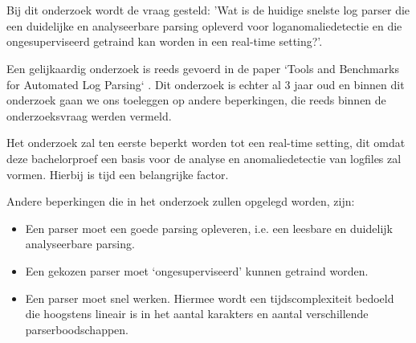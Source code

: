 \section{}
\label{sec:onderzoeksvraag}


Bij dit onderzoek wordt de vraag gesteld: 'Wat is de huidige snelste log parser die een duidelijke en analyseerbare parsing opleverd voor loganomaliedetectie en die ongesuperviseerd getraind kan worden in een real-time setting?'.

Een gelijkaardig onderzoek is reeds gevoerd in de paper `Tools and Benchmarks for Automated Log Parsing` \autocite{TBA2019}. Dit onderzoek is echter al 3 jaar oud en binnen dit onderzoek gaan we ons toeleggen op andere beperkingen, die reeds binnen de onderzoeksvraag werden vermeld.

Het onderzoek zal ten eerste beperkt worden tot een real-time setting, dit omdat deze bachelorproef een basis voor de analyse en anomaliedetectie van logfiles zal vormen. Hierbij is tijd een belangrijke factor. 

Andere beperkingen die in het onderzoek zullen opgelegd worden, zijn:
\begin{itemize}
    \item Een parser moet een goede parsing opleveren, i.e. een leesbare en duidelijk analyseerbare parsing.
    \item Een gekozen parser moet ‘ongesuperviseerd’ kunnen getraind worden.
    \item Een parser moet snel werken. Hiermee wordt een tijdscomplexiteit bedoeld die hoogstens lineair is in het aantal karakters en aantal verschillende parserboodschappen.
\end{itemize}

\section{}
\label{sec:onderzoeksdoelstelling}

